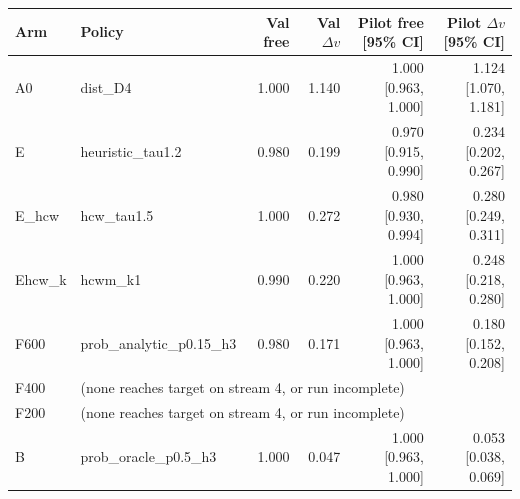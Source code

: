 \begin{tabular}{llrrrr}
\hline
Arm & Policy & Val free & Val $\Delta v$ & Pilot free [95\% CI] & Pilot $\Delta v$ [95\% CI]\\
\hline
A0 & dist\_D4 & 1.000 & 1.140 & 1.000 [0.963, 1.000] & 1.124 [1.070, 1.181]\\
E & heuristic\_tau1.2 & 0.980 & 0.199 & 0.970 [0.915, 0.990] & 0.234 [0.202, 0.267]\\
E\_hcw & hcw\_tau1.5 & 1.000 & 0.272 & 0.980 [0.930, 0.994] & 0.280 [0.249, 0.311]\\
Ehcw\_k & hcwm\_k1 & 0.990 & 0.220 & 1.000 [0.963, 1.000] & 0.248 [0.218, 0.280]\\
F600 & prob\_analytic\_p0.15\_h3 & 0.980 & 0.171 & 1.000 [0.963, 1.000] & 0.180 [0.152, 0.208]\\
F400 & \multicolumn{5}{l}{(none reaches target on stream 4, or run incomplete)}\\
F200 & \multicolumn{5}{l}{(none reaches target on stream 4, or run incomplete)}\\
B & prob\_oracle\_p0.5\_h3 & 1.000 & 0.047 & 1.000 [0.963, 1.000] & 0.053 [0.038, 0.069]\\
\hline
\end{tabular}

